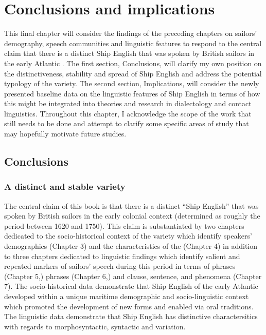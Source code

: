 \chapter{{Conclusions and implications}}

This final chapter will consider the findings of the preceding chapters on sailors’ demography, speech communities and linguistic features to respond to the central claim that there is a distinct Ship English that was spoken by British sailors in the early Atlantic . The first section, Conclusions, will clarify my own position on the distinctiveness, stability and spread of Ship English and address the potential typology of the variety. The second section, Implications, will consider the newly presented baseline data on the linguistic features of Ship English in terms of how this might be integrated into theories and research in dialectology and contact linguistics. Throughout this chapter, I acknowledge the scope of the work that still needs to be done and attempt to clarify some specific areas of study that may hopefully motivate future studies.

\section{{Conclusions}}%

\subsection{{A distinct and stable variety}}%

The central claim of this book is that there is a distinct “Ship English” that was spoken by British sailors in the early colonial context (determined as roughly the period between 1620 and 1750). This claim is substantiated by two chapters dedicated to the socio-historical context of the variety which identify speakers’ demographics (Chapter 3) and the characteristics of the  (Chapter 4) in addition to three chapters dedicated to linguistic findings which identify salient and repeated markers of sailors’ speech during this period in terms of  phrases (Chapter 5,)  phrases (Chapter 6,) and clause, sentence, and  phenomena (Chapter 7). The socio-historical data demonstrate that Ship English of the early Atlantic  developed within a unique maritime demographic and socio-linguistic context which promoted the development of new forms and enabled  via oral traditions. The linguistic data demonstrate that Ship English has distinctive charactersitics with regards to morphosyntactic, syntactic and  variation.


